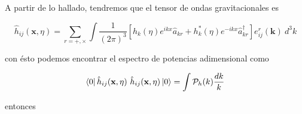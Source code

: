 A partir de lo hallado, tendremos que el tensor de ondas gravitacionales es

\begin{equation}
    \hat{h}_{ij} (\textbf{x}, \eta) = \sum_{r = +, \times} \int \frac{1}{(2 \pi)^{3}} \left[ h_k (\eta) e^{ikx} \hat{a}_{kr} + h^*_k (\eta) e^{-ikx} \hat{a}^\dagger_{kr} \right] e_{ij}^r (\textbf{k}) \ d^3 k
\end{equation}

\noindent
con ésto podemos encontrar el espectro de potencias adimensional como

\begin{equation}
    \bra{0} \hat{h}_{ij} (\textbf{x},\eta) \ \hat{h}_{ij} (\textbf{x}, \eta) \ket{0} = \int \mathcal{P}_h (k) \frac{dk}{k} 
\end{equation}

\noindent
entonces

